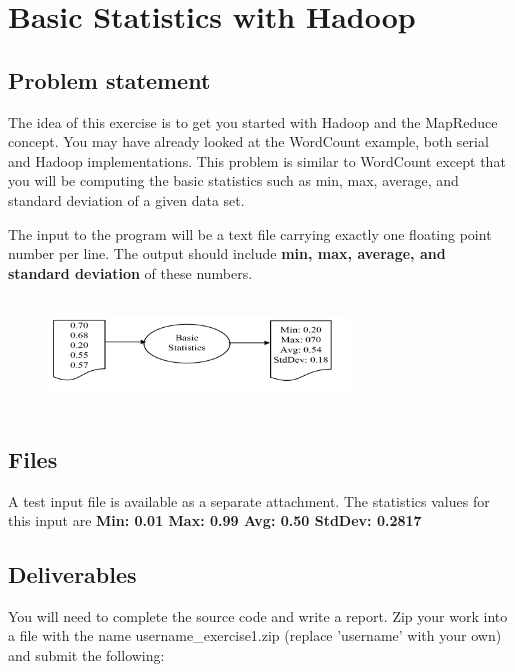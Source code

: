\FILENAME

\section*{Basic Statistics with Hadoop}       

\subsection*{Problem statement}
 
The idea of this exercise is to get you started with Hadoop and the MapReduce
concept. You may have already looked at the WordCount example, both serial and
Hadoop implementations. This problem is similar to WordCount except that you
will be computing the basic statistics such as min, max, average, and standard
deviation of a given data set.

The input to the program will be a text file carrying exactly one floating
point number per line. The output should include \textbf{min, max, average, and
standard deviation} of these numbers.

\begin{figure}[!htbp]
\includegraphics[width=8cm,height=3cm]{section/icloud/assignment/problems/project1/p1example.png}
\centering
\end{figure}

\subsection*{Files}
A test input file is available as a separate attachment.
The statistics values for this input are \textbf{Min: 0.01 Max: 0.99 Avg: 0.50 StdDev: 0.2817}


\subsection*{Deliverables}

You will need to complete the source code and write a report. Zip your work
into a file with the name username\_exercise1.zip (replace 'username' with your
own) and submit the following:


